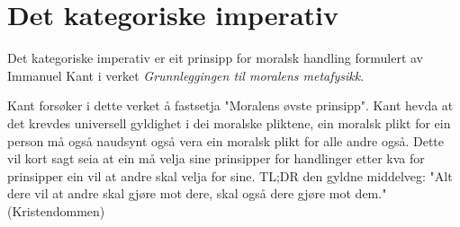 \documentclass[a4paper]{IEEEtran}
\begin{document}
\section{Det kategoriske imperativ}
\label{detkategoriskeimperativ}\bigskip

Det kategoriske imperativ er eit prinsipp for moralsk handling formulert av Immanuel Kant i verket \textit{Grunnleggingen til moralens metafysikk}.\bigskip

Kant forsøker i dette verket å fastsetja "Moralens øvste prinsipp". Kant hevda at det krevdes universell gyldighet i dei moralske pliktene, ein moralsk plikt for ein person må også naudsynt også vera ein moralsk plikt for alle andre også. Dette vil kort sagt seia at ein må velja sine prinsipper for handlinger etter kva for prinsipper ein vil at andre skal velja for sine. TL;DR den gyldne middelveg: "Alt dere vil at andre skal gjøre mot dere, skal også dere gjøre mot dem." (Kristendommen)



\end{document}
